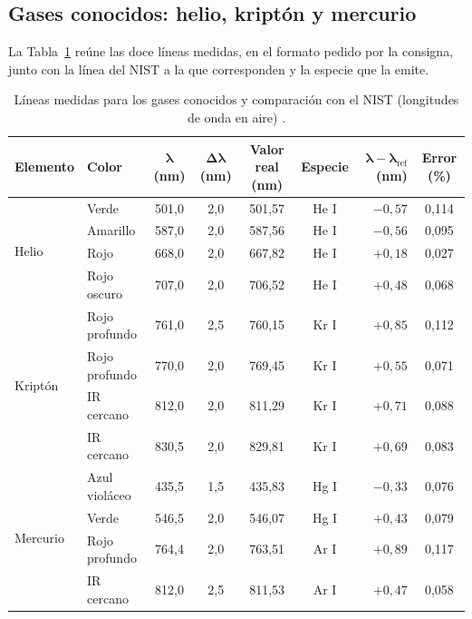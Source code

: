 \documentclass{article}
\begin{document}
\subsection{Gases conocidos: helio, kriptón y mercurio}

La Tabla~\ref{tab:conocidos} reúne las doce líneas medidas, en el formato pedido por la consigna, junto con la línea del NIST a la que corresponden y la especie que la emite.

\begin{table}[H]
\centering\small
\caption{Líneas medidas para los gases conocidos y comparación con el NIST (longitudes de onda en aire) \cite{nist-he,nist-kr,nist-hg,nist-ar}.}
\label{tab:conocidos}
\begin{tabular}{@{}llccccrc@{}}
\toprule
\textbf{Elemento} & \textbf{Color} & $\boldsymbol{\lambda}$ \textbf{(nm)} & $\boldsymbol{\Delta\lambda}$ \textbf{(nm)} & \textbf{Valor real (nm)} & \textbf{Especie} & $\boldsymbol{\lambda-\lambda_{\mathrm{ref}}}$ \textbf{(nm)} & \textbf{Error (\%)}\\
\midrule
\multirow{4}{*}{Helio}    & Verde         & 501,0 & 2,0 & 501,57 & He I & $-0,57$ & 0,114\\
                          & Amarillo      & 587,0 & 2,0 & 587,56 & He I & $-0,56$ & 0,095\\
                          & Rojo          & 668,0 & 2,0 & 667,82 & He I & $+0,18$ & 0,027\\
                          & Rojo oscuro   & 707,0 & 2,0 & 706,52 & He I & $+0,48$ & 0,068\\
\midrule
\multirow{4}{*}{Kriptón}  & Rojo profundo & 761,0 & 2,5 & 760,15 & Kr I & $+0,85$ & 0,112\\
                          & Rojo profundo & 770,0 & 2,0 & 769,45 & Kr I & $+0,55$ & 0,071\\
                          & IR cercano    & 812,0 & 2,0 & 811,29 & Kr I & $+0,71$ & 0,088\\
                          & IR cercano    & 830,5 & 2,0 & 829,81 & Kr I & $+0,69$ & 0,083\\
\midrule
\multirow{4}{*}{Mercurio} & Azul violáceo & 435,5 & 1,5 & 435,83 & Hg I & $-0,33$ & 0,076\\
                          & Verde         & 546,5 & 2,0 & 546,07 & Hg I & $+0,43$ & 0,079\\
                          & Rojo profundo & 764,4 & 2,0 & 763,51 & Ar I & $+0,89$ & 0,117\\
                          & IR cercano    & 812,0 & 2,5 & 811,53 & Ar I & $+0,47$ & 0,058\\
\bottomrule
\end{tabular}
\end{table}
\end{document}

